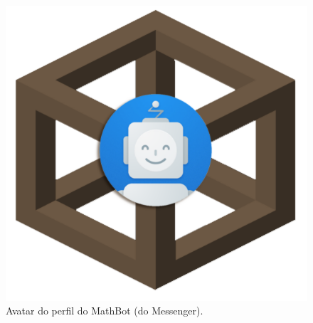 \begin{figure}[h!tbp]
    \centering
    \includegraphics[width=0.4\linewidth]{img/bot2_logo.png}
    \caption{Avatar do perfil do MathBot (do Messenger).}
    \label{fig:bot2_logo}
\end{figure}